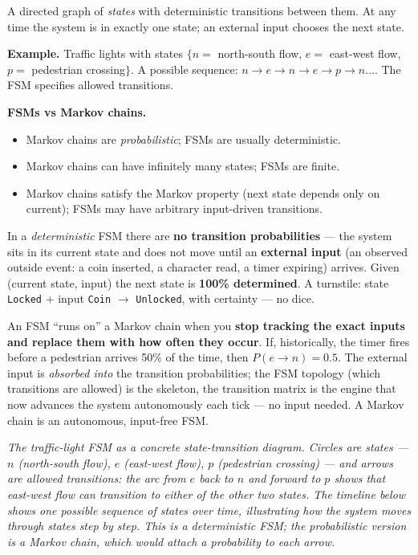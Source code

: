 \documentclass[11pt, a4paper]{article}
\begin{document}
\begin{defbox}
A directed graph of \emph{states} with deterministic transitions between them. At any time the system is in exactly one state; an external input chooses the next state.
\end{defbox}

\textbf{Example.} Traffic lights with states $\{n=$ north-south flow, $e=$ east-west flow, $p=$ pedestrian crossing$\}$. A possible sequence: $n \to e \to n \to e \to p \to n \ldots$. The FSM specifies allowed transitions.

\textbf{FSMs vs Markov chains.}
\begin{itemize}
  \item Markov chains are \emph{probabilistic}; FSMs are usually deterministic.
  \item Markov chains can have infinitely many states; FSMs are finite.
  \item Markov chains satisfy the Markov property (next state depends only on current); FSMs may have arbitrary input-driven transitions.
\end{itemize}

\begin{notebox}
In a \emph{deterministic} FSM there are \textbf{no transition probabilities} — the system sits in its
current state and does not move until an \textbf{external input} (an observed outside event: a coin
inserted, a character read, a timer expiring) arrives. Given (current state, input) the next state is
\textbf{100\% determined}. A turnstile: state \texttt{Locked} $+$ input \texttt{Coin}
$\to$ \texttt{Unlocked}, with certainty — no dice.

An FSM ``runs on'' a Markov chain when you \textbf{stop tracking the exact inputs and replace them
with how often they occur}. If, historically, the timer fires before a pedestrian arrives 50\% of the
time, then $P(e\to n)=0.5$. The external input is \emph{absorbed into} the transition probabilities;
the FSM topology (which transitions are allowed) is the skeleton, the transition matrix is the engine
that now advances the system autonomously each tick — no input needed. A Markov chain is an
autonomous, input-free FSM.
\end{notebox}

\begin{center}

\footnotesize\textit{The traffic-light FSM as a concrete state-transition diagram. Circles are states --- $n$ (north-south flow), $e$ (east-west flow), $p$ (pedestrian crossing) --- and arrows are allowed transitions: the arc from $e$ back to $n$ and forward to $p$ shows that east-west flow can transition to either of the other two states. The timeline below shows one possible sequence of states over time, illustrating how the system moves through states step by step. This is a \emph{deterministic} FSM; the probabilistic version is a Markov chain, which would attach a probability to each arrow.}
\end{center}
\end{document}
